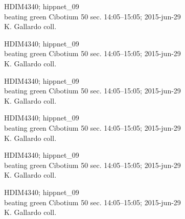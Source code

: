 \documentclass[2pt]{extarticle}
\begin{document}
\noindent
\parbox{0.16\textwidth}{\tiny \raggedright \rule[-0.3\baselineskip]{0pt}{10pt}HDIM4340; hippnet\_09\\ beating green Cibotium 50 sec. 14:05--15:05; 2015-jun-29\\ K. Gallardo coll.}
\parbox{0.16\textwidth}{\tiny \raggedright \rule[-0.3\baselineskip]{0pt}{10pt}HDIM4340; hippnet\_09\\ beating green Cibotium 50 sec. 14:05--15:05; 2015-jun-29\\ K. Gallardo coll.}
\parbox{0.16\textwidth}{\tiny \raggedright \rule[-0.3\baselineskip]{0pt}{10pt}HDIM4340; hippnet\_09\\ beating green Cibotium 50 sec. 14:05--15:05; 2015-jun-29\\ K. Gallardo coll.}
\parbox{0.16\textwidth}{\tiny \raggedright \rule[-0.3\baselineskip]{0pt}{10pt}HDIM4340; hippnet\_09\\ beating green Cibotium 50 sec. 14:05--15:05; 2015-jun-29\\ K. Gallardo coll.}
\parbox{0.16\textwidth}{\tiny \raggedright \rule[-0.3\baselineskip]{0pt}{10pt}HDIM4340; hippnet\_09\\ beating green Cibotium 50 sec. 14:05--15:05; 2015-jun-29\\ K. Gallardo coll.}
\parbox{0.16\textwidth}{\tiny \raggedright \rule[-0.3\baselineskip]{0pt}{10pt}HDIM4340; hippnet\_09\\ beating green Cibotium 50 sec. 14:05--15:05; 2015-jun-29\\ K. Gallardo coll.} \\ 
\vspace{0.001in} 
\end{document}
